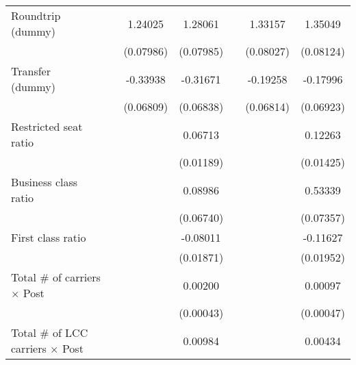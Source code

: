 \begin{table}[htbp]
\begin{tabular}{l*{6}{c}}
\addlinespace
\shortstack{Roundtrip \\ (dummy)}&                     &     1.24025\sym{***}&     1.28061\sym{***}&                     &     1.33157\sym{***}&     1.35049\sym{***}\\
                    &                     &   (0.07986)         &   (0.07985)         &                     &   (0.08027)         &   (0.08124)         \\
\addlinespace
\shortstack{Transfer \\ (dummy)}&                     &    -0.33938\sym{***}&    -0.31671\sym{***}&                     &    -0.19258\sym{***}&    -0.17996\sym{***}\\
                    &                     &   (0.06809)         &   (0.06838)         &                     &   (0.06814)         &   (0.06923)         \\
\addlinespace
Restricted seat ratio&                     &                     &     0.06713\sym{***}&                     &                     &     0.12263\sym{***}\\
                    &                     &                     &   (0.01189)         &                     &                     &   (0.01425)         \\
\addlinespace
Business class ratio&                     &                     &     0.08986         &                     &                     &     0.53339\sym{***}\\
                    &                     &                     &   (0.06740)         &                     &                     &   (0.07357)         \\
\addlinespace
First class ratio   &                     &                     &    -0.08011\sym{***}&                     &                     &    -0.11627\sym{***}\\
                    &                     &                     &   (0.01871)         &                     &                     &   (0.01952)         \\
\addlinespace
Total # of carriers $\times$ Post&                     &                     &     0.00200\sym{***}&                     &                     &     0.00097\sym{**} \\
                    &                     &                     &   (0.00043)         &                     &                     &   (0.00047)         \\
\addlinespace
Total # of LCC carriers $\times$ Post&                     &                     &     0.00984\sym{***}&                     &                     &     0.00434\sym{***}\\

\end{tabular}
\end{table}
